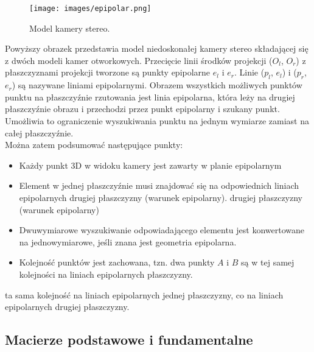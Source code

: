 \documentclass[magisterska]{pracadypl}
\begin{document}
\begin{figure}[H]  %
    \centering  %
    \texttt{[image: images/epipolar.png]}  %
    \captionsetup{font=footnotesize}
    \caption[Model kamery stereo. Learning OpenCV 3, O'Reilly, Str. 709]{Model kamery stereo.}
    \label{fig:rpi}  %
\end{figure}

Powyższy obrazek przedstawia model niedoskonałej kamery stereo składającej się z dwóch modeli kamer otworkowych.
Przecięcie linii środków projekcji ($O_l$, $O_r$) z płaszczyznami projekcji tworzone są punkty epipolarne $e_l$ i $e_r$. Linie ($p_l$, $e_l$) i ($p_r$, $e_r$) są nazywane liniami epipolarnymi. Obrazem wszystkich możliwych punktów punktu
na płaszczyźnie rzutowania jest linia epipolarna, która leży na drugiej płaszczyźnie obrazu i
przechodzi przez punkt epipolarny i szukany punkt. Umożliwia to ograniczenie wyszukiwania punktu na jednym wymiarze zamiast na całej płaszczyźnie.\\
Można zatem podsumować następujące punkty:

\begin{itemize}
  \item Każdy punkt 3D w widoku kamery jest zawarty w planie epipolarnym
  \item Element w jednej płaszczyźnie musi znajdować się na odpowiednich liniach epipolarnych drugiej płaszczyzny (warunek epipolarny).
drugiej płaszczyzny (warunek epipolarny)
  \item Dwuwymiarowe wyszukiwanie odpowiadającego elementu jest konwertowane na
jednowymiarowe, jeśli znana jest geometria epipolarna.
  \item Kolejność punktów jest zachowana, tzn. dwa punkty $A$ i $B$ są w tej samej kolejności na liniach epipolarnych płaszczyzny.

\end{itemize}

ta sama kolejność na liniach epipolarnych jednej płaszczyzny, co na liniach epipolarnych drugiej płaszczyzny.

\subsection{Macierze podstawowe i fundamentalne}
\end{document}

